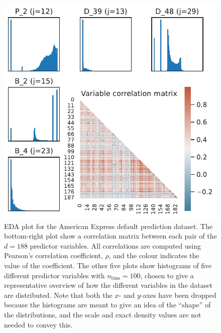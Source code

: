 \documentclass{statsmsc}
\begin{document}
{%
\begin{figure}
\begin{center}
    \includegraphics[scale=1]{figures/amex_data_eda_plot.pdf}
\end{center}
\caption{
    \ac{EDA} plot for the American Express default prediction
    dataset.  The bottom-right plot show a correlation matrix between each pair
    of the $d=188$ predictor variables. All correlations are computed using
    Pearson's correlation coefficient, $\rho$, and the colour indicates the
    value of the coefficient.  The other five plots show histograms of five
    different predictor variables with $n_{\textrm{bins}}=100$,
    chosen to give a representative overview of
    how the different variables in the dataset are distributed.
    Note that both the $x$- and $y$-axes have been dropped because the histograms
    are meant to give an idea of the ``shape'' of the distributions, and 
    the scale and exact density values are not needed to convey this.
}
\label{fig:amex_eda}
\end{figure}


}
\end{document}
